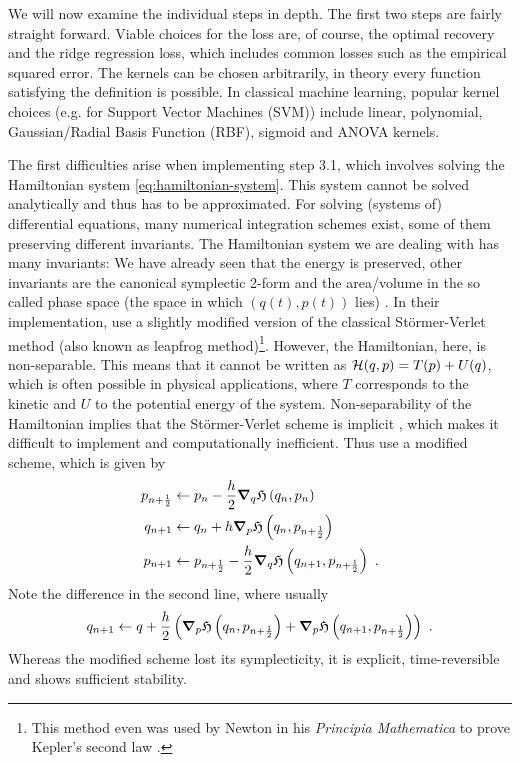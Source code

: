 We will now examine the individual steps in depth.
The first two steps are fairly straight forward.
Viable choices for the loss are, of course, the optimal recovery and the ridge regression loss, which includes common losses such as the empirical squared error.
The kernels can be chosen arbitrarily, in theory every function satisfying the definition is possible.
In classical machine learning, popular kernel choices (e.g. for Support Vector Machines (SVM)) include linear, polynomial, Gaussian/Radial Basis Function (RBF), sigmoid and ANOVA kernels.

The first difficulties arise when implementing step 3.1, which involves solving the Hamiltonian system \ref{eq:hamiltonian-system}.
This system cannot be solved analytically and thus has to be approximated.
For solving (systems of) differential equations, many numerical integration schemes exist, some of them preserving different invariants.
The Hamiltonian system we are dealing with has many invariants:
We have already seen that the energy is preserved, other invariants are the canonical symplectic 2-form \cite{marsden10} and the area/volume in the so called phase space (the space in which $(q(t), p(t))$ lies) \cite{hairer06}.
In their implementation, \citet{owhadi20} use a slightly modified version of the classical Störmer-Verlet method (also known as leapfrog method)\footnote{This method even was used by Newton in his \emph{Principia Mathematica} to prove Kepler's second law \cite{hairer03}.}.
However, the Hamiltonian, here, is non-separable.
This means that it cannot be written as $\mathcal{H}(q, p) = T(p) + U(q)$, which is often possible in physical applications, where $T$ corresponds to the kinetic and $U$ to the potential energy of the system.
Non-separability of the Hamiltonian implies that the Störmer-Verlet scheme is implicit \cite{hairer06}, which makes it difficult to implement and computationally inefficient.
Thus \citet{owhadi20} use a modified scheme, which is given by
\begin{align}
	p_{n+\frac{1}{2}} &\gets p_n - \frac{h}{2} \grad_q\mathfrak{H}\left(q_n, p_n\right) \label{eq:leapfrog-p.5}\\
	q_{n+1} &\gets q_n + h \grad_p\mathfrak{H}\left(q_n, p_{n+\frac{1}{2}}\right)\\
	p_{n+1} &\gets p_{n+\frac{1}{2}} - \frac{h}{2} \grad_q\mathfrak{H}\left(q_{n+1}, p_{n+\frac{1}{2}}\right) \label{eq:leapfrog-p1}\ .
\end{align}
Note the difference in the second line, where usually 
\begin{equation}
q_{n+1} \gets q + \frac{h}{2} \left(\grad_p\mathfrak{H}\left(q_n, p_{n+\frac{1}{2}}\right) + \grad_p\mathfrak{H}\left(q_{n+1}, p_{n+\frac{1}{2}}\right)\right) \ .
\end{equation}
Whereas the modified scheme lost its symplecticity, it is explicit, time-reversible and shows sufficient stability.

